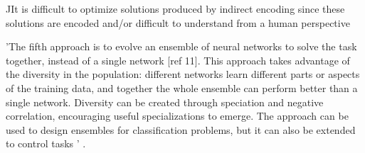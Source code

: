 

^^
It is difficult to optimize solutions produced by indirect encoding since these solutions are encoded and/or difficult to understand from a human perspective


'The fifth approach is to evolve an ensemble of neural networks to solve the task together, instead of a single network [ref 11]. This approach takes advantage of the diversity in the population: different networks learn different parts or aspects of the training data, and together the whole ensemble can perform better than a single network. Diversity can be created through speciation and negative correlation, encouraging useful specializations to emerge. The approach can be used to design ensembles for classification problems, but it can also be extended to control tasks ' \cite{Miikkulainen2010}.

